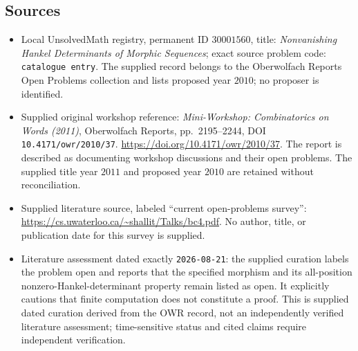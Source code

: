 \documentclass[11pt]{article}
\begin{document}
\subsection{Sources}
\begin{itemize}
\item Local UnsolvedMath registry, permanent ID \(30001560\), title: \emph{Nonvanishing Hankel Determinants of Morphic Sequences}; exact source problem code: \texttt{catalogue entry}. The supplied record belongs to the Oberwolfach Reports Open Problems collection and lists proposed year \(2010\); no proposer is identified.
\item Supplied original workshop reference: \emph{Mini-Workshop: Combinatorics on Words (2011)}, Oberwolfach Reports, pp.~2195--2244, DOI \texttt{10.4171/owr/2010/37}. \url{https://doi.org/10.4171/owr/2010/37}. The report is described as documenting workshop discussions and their open problems. The supplied title year \(2011\) and proposed year \(2010\) are retained without reconciliation.
\item Supplied literature source, labeled ``current open-problems survey'': \url{https://cs.uwaterloo.ca/~shallit/Talks/bc4.pdf}. No author, title, or publication date for this survey is supplied.
\item Literature assessment dated exactly \texttt{2026-08-21}: the supplied curation labels the problem open and reports that the specified morphism and its all-position nonzero-Hankel-determinant property remain listed as open. It explicitly cautions that finite computation does not constitute a proof. This is supplied dated curation derived from the OWR record, not an independently verified literature assessment; time-sensitive status and cited claims require independent verification.
\end{itemize}
\end{document}
